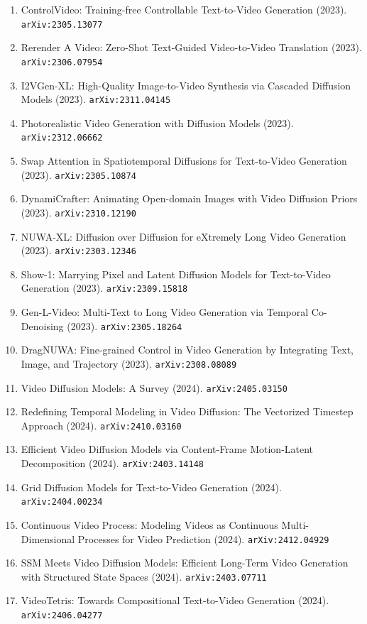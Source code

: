 \documentclass[11pt]{article}
\begin{document}
\begin{enumerate}
  \item ControlVideo: Training-free Controllable Text-to-Video Generation (2023). \texttt{arXiv:2305.13077}
  \item Rerender A Video: Zero-Shot Text-Guided Video-to-Video Translation (2023). \texttt{arXiv:2306.07954}
  \item I2VGen-XL: High-Quality Image-to-Video Synthesis via Cascaded Diffusion
  Models (2023). \texttt{arXiv:2311.04145}
  \item Photorealistic Video Generation with Diffusion Models (2023). \texttt{arXiv:2312.06662}
  \item Swap Attention in Spatiotemporal Diffusions for Text-to-Video Generation (2023). \texttt{arXiv:2305.10874}
  \item DynamiCrafter: Animating Open-domain Images with Video Diffusion Priors (2023). \texttt{arXiv:2310.12190}
  \item NUWA-XL: Diffusion over Diffusion for eXtremely Long Video Generation (2023). \texttt{arXiv:2303.12346}
  \item Show-1: Marrying Pixel and Latent Diffusion Models for Text-to-Video Generation (2023). \texttt{arXiv:2309.15818}
  \item Gen-L-Video: Multi-Text to Long Video Generation via Temporal
  Co-Denoising (2023). \texttt{arXiv:2305.18264}
  \item DragNUWA: Fine-grained Control in Video Generation by Integrating Text,
  Image, and Trajectory (2023). \texttt{arXiv:2308.08089}
  \item Video Diffusion Models: A Survey (2024). \texttt{arXiv:2405.03150}
  \item Redefining Temporal Modeling in Video Diffusion: The Vectorized Timestep
  Approach (2024). \texttt{arXiv:2410.03160}
  \item Efficient Video Diffusion Models via Content-Frame Motion-Latent
  Decomposition (2024). \texttt{arXiv:2403.14148}
  \item Grid Diffusion Models for Text-to-Video Generation (2024). \texttt{arXiv:2404.00234}
  \item Continuous Video Process: Modeling Videos as Continuous
  Multi-Dimensional Processes for Video Prediction (2024). \texttt{arXiv:2412.04929}
  \item SSM Meets Video Diffusion Models: Efficient Long-Term Video Generation
  with Structured State Spaces (2024). \texttt{arXiv:2403.07711}
  \item VideoTetris: Towards Compositional Text-to-Video Generation (2024). \texttt{arXiv:2406.04277}

\end{enumerate}
\end{document}
